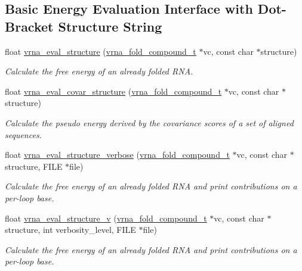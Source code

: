 \subsection*{Basic Energy Evaluation Interface with Dot-\/\+Bracket Structure String}
\begin{DoxyCompactItemize}
\item 
float \hyperlink{group__eval_ga58f199f1438d794a265f3b27fc8ea631}{vrna\+\_\+eval\+\_\+structure} (\hyperlink{group__fold__compound_ga1b0cef17fd40466cef5968eaeeff6166}{vrna\+\_\+fold\+\_\+compound\+\_\+t} $\ast$vc, const char $\ast$structure)
\begin{DoxyCompactList}\small\item\em Calculate the free energy of an already folded R\+NA. \end{DoxyCompactList}\item 
float \hyperlink{group__eval_ga6cea75c0eb9857fb59172be54cab09e0}{vrna\+\_\+eval\+\_\+covar\+\_\+structure} (\hyperlink{group__fold__compound_ga1b0cef17fd40466cef5968eaeeff6166}{vrna\+\_\+fold\+\_\+compound\+\_\+t} $\ast$vc, const char $\ast$structure)
\begin{DoxyCompactList}\small\item\em Calculate the pseudo energy derived by the covariance scores of a set of aligned sequences. \end{DoxyCompactList}\item 
float \hyperlink{group__eval_ga0928d699d310178f84ee2351034e5cb5}{vrna\+\_\+eval\+\_\+structure\+\_\+verbose} (\hyperlink{group__fold__compound_ga1b0cef17fd40466cef5968eaeeff6166}{vrna\+\_\+fold\+\_\+compound\+\_\+t} $\ast$vc, const char $\ast$structure, F\+I\+LE $\ast$file)
\begin{DoxyCompactList}\small\item\em Calculate the free energy of an already folded R\+NA and print contributions on a per-\/loop base. \end{DoxyCompactList}\item 
float \hyperlink{group__eval_gab12e6b1226227670322150df018734f8}{vrna\+\_\+eval\+\_\+structure\+\_\+v} (\hyperlink{group__fold__compound_ga1b0cef17fd40466cef5968eaeeff6166}{vrna\+\_\+fold\+\_\+compound\+\_\+t} $\ast$vc, const char $\ast$structure, int verbosity\+\_\+level, F\+I\+LE $\ast$file)
\begin{DoxyCompactList}\small\item\em Calculate the free energy of an already folded R\+NA and print contributions on a per-\/loop base. \end{DoxyCompactList}\end{DoxyCompactItemize}
